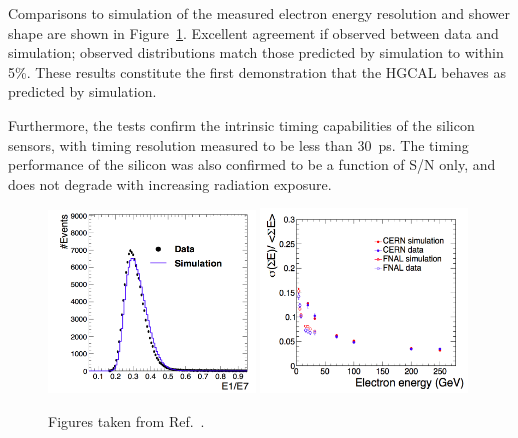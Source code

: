 Comparisons to simulation of the measured electron energy resolution 
and shower shape are shown in Figure~\ref{fig:hgcal_BeamTest}.
Excellent agreement if observed between data and simulation;
observed distributions match those predicted by simulation to within 5\%. 
These results constitute the first demonstration that the HGCAL behaves as predicted by simulation.

Furthermore, the tests confirm the intrinsic timing capabilities of the silicon sensors, 
with timing resolution measured to be less than \SI{30}{\pico\second}.
The timing performance of the silicon was also confirmed to be a function of S/N only, 
and does not degrade with increasing radiation exposure. 

\begin{figure}[h!]
  \centering
  \includegraphics[width=0.49\textwidth]{Figures/HGCAL/BeamTestShape.png}
  \includegraphics[width=0.49\textwidth]{Figures/HGCAL/BeamTestEnergy.png}
  \caption[Comparison of data and simulation in HGCAL beam tests.]
  {
    Figures taken from Ref.~\cite{HGCAL}.
  }
  \label{fig:hgcal_BeamTest}
\end{figure}
